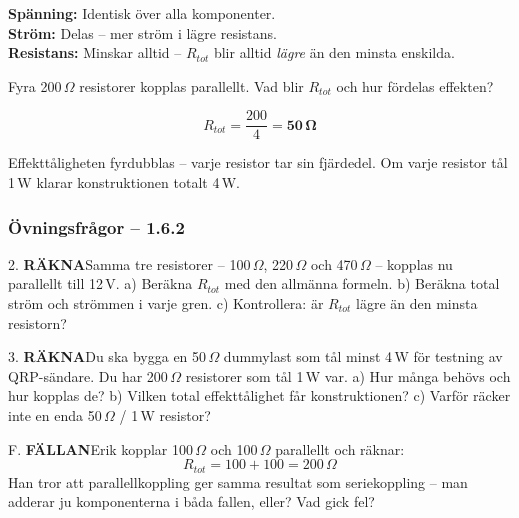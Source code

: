 \documentclass[a4paper,11pt,twoside]{book}
\newcommand{\emoji}[1]{{\emojifont #1}}
\newcommand{\qrakna}{\colorbox{bluepale}{\textcolor{bluedark}{\headingfont\bfseries\tiny RÄKNA}}}
\newcommand{\qfallan}{\colorbox{ljusbrun}{\textcolor{kakao}{\headingfont\bfseries\tiny FÄLLAN}}}
\begin{document}
\begin{bluebox}[title={\emoji{🔑} Nyckelsamband -- parallell}]
\textbf{Spänning:} Identisk över alla komponenter.\\
\textbf{Ström:} Delas -- mer ström i lägre resistans.\\
\textbf{Resistans:} Minskar alltid -- $R_{tot}$ blir 
alltid \emph{lägre} än den minsta enskilda.
\end{bluebox}

\begin{worked}[title={Räkneexempel 1.6.2 -- Dummylast av 200\,$\Omega$-resistorer}]
Fyra 200\,$\Omega$ resistorer kopplas parallellt. Vad 
blir $R_{tot}$ och hur fördelas effekten?

\[ R_{tot} = \frac{200}{4} = \mathbf{50\,\Omega} \]

Effekttåligheten fyrdubblas -- varje resistor tar sin 
fjärdedel. Om varje resistor tål 1\,W klarar 
konstruktionen totalt 4\,W.
\end{worked}

\subsubsection*{Övningsfrågor -- 1.6.2}

\begin{qblock}{2.}
\qrakna\quad Samma tre resistorer -- 100\,$\Omega$, 
220\,$\Omega$ och 470\,$\Omega$ -- kopplas nu parallellt 
till 12\,V. 
a) Beräkna $R_{tot}$ med den allmänna formeln. 
b) Beräkna total ström och strömmen i varje gren. 
c) Kontrollera: är $R_{tot}$ lägre än den minsta 
resistorn?
\end{qblock}

\begin{qblock}{3.}
\qrakna\quad Du ska bygga en 50\,$\Omega$ dummylast som 
tål minst 4\,W för testning av QRP-sändare. Du har 
200\,$\Omega$ resistorer som tål 1\,W var. 
a) Hur många behövs och hur kopplas de? 
b) Vilken total effekttålighet får konstruktionen? 
c) Varför räcker inte en enda 50\,$\Omega$ / 1\,W resistor?
\end{qblock}

\begin{qblock}{F.}
\qfallan\quad Erik kopplar 100\,$\Omega$ och 100\,$\Omega$ 
parallellt och räknar:
\[ R_{tot} = 100 + 100 = 200\,\Omega \]
Han tror att parallellkoppling ger samma resultat som 
seriekoppling -- man adderar ju komponenterna i båda 
fallen, eller? Vad gick fel?
\end{qblock}
\end{document}

